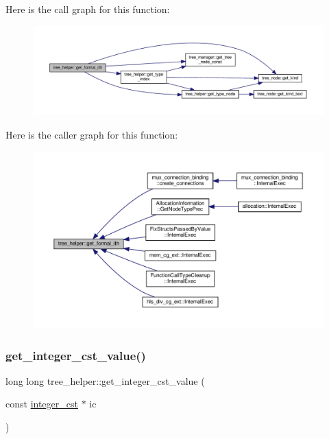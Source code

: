 Here is the call graph for this function\+:
\nopagebreak
\begin{figure}[H]
\begin{center}
\leavevmode
\includegraphics[width=350pt]{d7/d99/classtree__helper_ab167a6cf8665fcf9f50a007f94dc0048_cgraph}
\end{center}
\end{figure}
Here is the caller graph for this function\+:
\nopagebreak
\begin{figure}[H]
\begin{center}
\leavevmode
\includegraphics[width=350pt]{d7/d99/classtree__helper_ab167a6cf8665fcf9f50a007f94dc0048_icgraph}
\end{center}
\end{figure}
\mbox{\label{classtree__helper_a697d99d005531eaac44d83d19225f02b}} 
\subsubsection{\texorpdfstring{get\+\_\+integer\+\_\+cst\+\_\+value()}{get\_integer\_cst\_value()}}
{\footnotesize\ttfamily long long tree\+\_\+helper\+::get\+\_\+integer\+\_\+cst\+\_\+value (\begin{DoxyParamCaption}\item[{const \hyperlink{structinteger__cst}{integer\+\_\+cst} $\ast$}]{ic }\end{DoxyParamCaption})\hspace{0.3cm}{\ttfamily [static]}}



